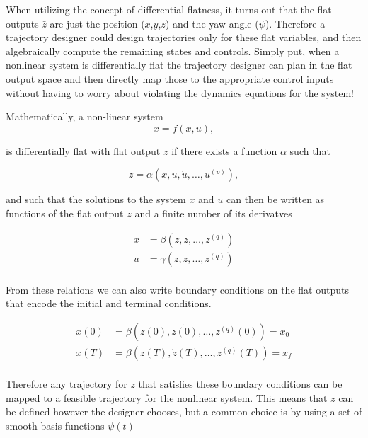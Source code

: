 \documentclass[twoside]{article}
\begin{document}
When utilizing the concept of differential flatness, it turns out that the flat outputs $\bar{z}$ are just the position ($x$,$y$,$z$) and the yaw angle ($\psi$). Therefore a trajectory designer could design trajectories only for these flat variables, and then algebraically compute the remaining states and controls. Simply put, when a nonlinear system is differentially flat the trajectory designer can plan in the flat output space and then directly map those to the appropriate control inputs without having to worry about violating the dynamics equations for the system!

Mathematically, a non-linear system
\begin{equation}
\dot{x} = f(x,u),
\end{equation}

is differentially flat with flat output $z$ if there exists a function $\alpha$ such that

\begin{equation}
z = \alpha (x,u,\dot{u},\dots,u^{(p)}),
\end{equation}

and such that the solutions to the system $x$ and $u$ can then be written as functions of the flat output $z$ and a finite number of its derivatves

\begin{equation}
\begin{split}
x &= \beta (z,\dot{z},\dots,z^{(q)}) \\
u &= \gamma (z,\dot{z},\dots,z^{(q)}) \\
\end{split}
\end{equation}

From these relations we can also write boundary conditions on the flat outputs that encode the initial and terminal conditions.

\begin{equation} \label{flatbc}
\begin{split}
x(0) &= \beta (z(0),\dot{z(0)},\dots,z^{(q)}(0)) = x_0 \\
x(T) &= \beta (z(T),\dot{z}(T),\dots,z^{(q)}(T)) = x_f \\
\end{split}
\end{equation}

Therefore any trajectory for $z$ that satisfies these boundary conditions can be mapped to a feasible trajectory for the nonlinear system. This means that $z$ can be defined however the designer chooses, but a common choice is by using a set of smooth basis functions $\psi(t)$
\end{document}
